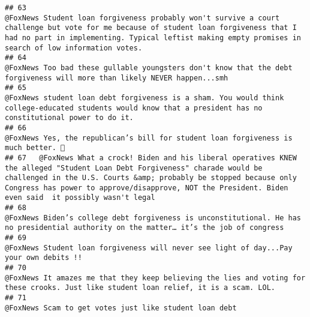 \documentclass[
]{article}
\begin{document}
\begin{verbatim}
## 63                                                            @FoxNews Student loan forgiveness probably won't survive a court challenge but vote for me because of student loan forgiveness that I had no part in implementing. Typical leftist making empty promises in search of low information votes.
## 64                                                                                                                                                                                @FoxNews Too bad these gullable youngsters don't know that the debt forgiveness will more than likely NEVER happen...smh
## 65                                                                                                                                           @FoxNews student loan debt forgiveness is a sham. You would think college-educated students would know that a president has no constitutional power to do it.
## 66                                                                                                                                                                                                                     @FoxNews Yes, the republican’s bill for student loan forgiveness is much better. 🤡
## 67   @FoxNews What a crock! Biden and his liberal operatives KNEW the alleged "Student Loan Debt Forgiveness" charade would be challenged in the U.S. Courts &amp; probably be stopped because only Congress has power to approve/disapprove, NOT the President. Biden even said  it possibly wasn't legal
## 68                                                                                                                                                                 @FoxNews Biden’s college debt forgiveness is unconstitutional. He has no presidential authority on the matter… it’s the job of congress
## 69                                                                                                                                                                                                                  @FoxNews Student loan forgiveness will never see light of day...Pay your own debits !!
## 70                                                                                                                                                                  @FoxNews It amazes me that they keep believing the lies and voting for these crooks. Just like student loan relief, it is a scam. LOL.
## 71                                                                                                                                                                                                                                                  @FoxNews Scam to get votes just like student loan debt

\end{verbatim}
\end{document}
